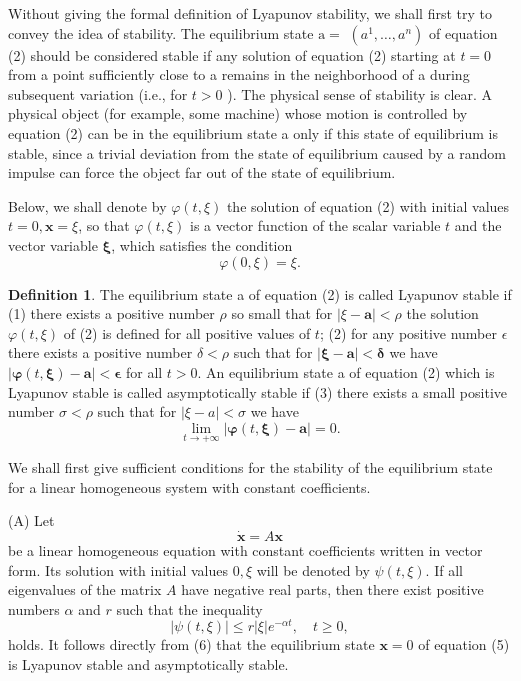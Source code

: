 \documentclass[10pt,a5paper]{book}
\theoremstyle{plain}
\theoremstyle{definition}
\newtheorem*{definition}{Definition}
\theoremstyle{remark}
\begin{document}
Without giving the formal definition of Lyapunov stability, we shall first try to convey the idea of stability. The equilibrium state $\mathrm{a}=$ $\left(a^{1}, \ldots, a^{n}\right)$ of equation (2) should be considered stable if any solution of equation (2) starting at $t=0$ from a point sufficiently close to a remains in the neighborhood of a during subsequent variation (i.e., for $t>0$ ). The physical sense of stability is clear. A physical object (for example, some machine) whose motion is controlled by equation (2) can be in the equilibrium state a only if this state of equilibrium is stable, since a trivial deviation from the state of equilibrium caused by a random impulse can force the object far out of the state of equilibrium.

Below, we shall denote by $\varphi(t, \xi)$ the solution of equation (2) with initial values $t=0, \mathbf{x}=\xi$, so that $\varphi(t, \xi)$ is a vector function of the scalar variable $t$ and the vector variable $\boldsymbol{\xi}$, which satisfies the condition
\begin{equation*}
\varphi(0, \xi)=\xi . \tag{4}
\end{equation*}

\begin{definition}
The equilibrium state a of equation (2) is called Lyapunov stable if (1) there exists a positive number $\rho$ so small that for $|\xi-\mathbf{a}|<\rho$ the solution $\varphi(t, \xi)$ of (2) is defined for all positive values of $t$; (2) for any positive number $\epsilon$ there exists a positive number $\delta<\rho$ such that for $|\boldsymbol{\xi}-\mathbf{a}|<\boldsymbol{\delta}$ we have $|\boldsymbol{\varphi}(t, \boldsymbol{\xi})-\mathbf{a}|<\boldsymbol{\epsilon}$ for all $t>0$. An equilibrium state a of equation (2) which is Lyapunov stable is called asymptotically stable if (3) there exists a small positive number $\sigma<\rho$ such that for $|\xi-a|<\sigma$ we have
\[
\lim _{t \rightarrow+\infty}|\boldsymbol{\varphi}(t, \boldsymbol{\xi})-\mathbf{a}|=0 .
\]
\end{definition}

We shall first give sufficient conditions for the stability of the equilibrium state for a linear homogeneous system with constant coefficients.

(A) Let
\begin{equation*}
\dot{\mathbf{x}}=A \mathbf{x} \tag{5}
\end{equation*}
be a linear homogeneous equation with constant coefficients written in vector form. Its solution with initial values $0, \xi$ will be denoted by $\psi(t, \xi)$. If all eigenvalues of the matrix $A$ have negative real parts, then there exist positive numbers $\alpha$ and $r$ such that the inequality
\begin{equation*}
|\psi(t, \xi)| \leq r|\xi| e^{-\alpha t}, \quad t \geq 0, \tag{6}
\end{equation*}
holds. It follows directly from (6) that the equilibrium state $\mathbf{x}=0$ of equation (5) is Lyapunov stable and asymptotically stable.
\end{document}
